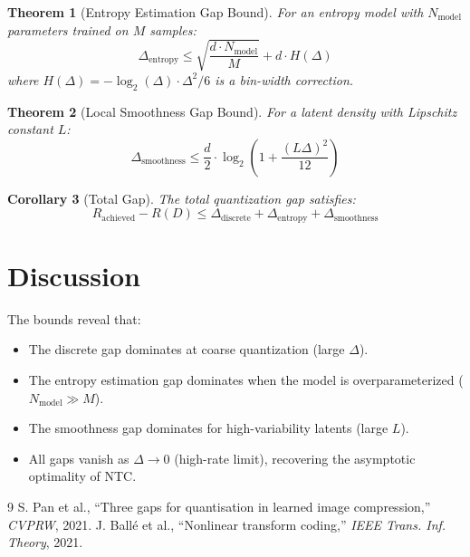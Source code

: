 \documentclass[11pt]{article}
\newtheorem{theorem}{Theorem}[section]
\newtheorem{corollary}[theorem]{Corollary}
\begin{document}
\begin{theorem}[Entropy Estimation Gap Bound]
\label{thm:entropy}
For an entropy model with $N_{\text{model}}$ parameters trained on $M$ samples:
\[
\Delta_{\text{entropy}} \leq \sqrt{\frac{d \cdot N_{\text{model}}}{M}} + d \cdot H(\Delta)
\]
where $H(\Delta) = -\log_2(\Delta) \cdot \Delta^2/6$ is a bin-width correction.
\end{theorem}

\begin{theorem}[Local Smoothness Gap Bound]
\label{thm:smoothness}
For a latent density with Lipschitz constant $L$:
\[
\Delta_{\text{smoothness}} \leq \frac{d}{2} \cdot \log_2\!\left(1 + \frac{(L\Delta)^2}{12}\right)
\]
\end{theorem}

\begin{corollary}[Total Gap]
The total quantization gap satisfies:
\[
R_{\text{achieved}} - R(D) \leq \Delta_{\text{discrete}} + \Delta_{\text{entropy}} + \Delta_{\text{smoothness}}
\]
\end{corollary}

\section{Discussion}

The bounds reveal that:
\begin{itemize}
    \item The discrete gap dominates at coarse quantization (large $\Delta$).
    \item The entropy estimation gap dominates when the model is overparameterized ($N_{\text{model}} \gg M$).
    \item The smoothness gap dominates for high-variability latents (large $L$).
    \item All gaps vanish as $\Delta \to 0$ (high-rate limit), recovering the asymptotic optimality of NTC.
\end{itemize}

\begin{thebibliography}{9}
 S. Pan et al., ``Three gaps for quantisation in learned image compression,'' \textit{CVPRW}, 2021.
 J. Ball\'{e} et al., ``Nonlinear transform coding,'' \textit{IEEE Trans. Inf. Theory}, 2021.
\end{thebibliography}
\end{document}
